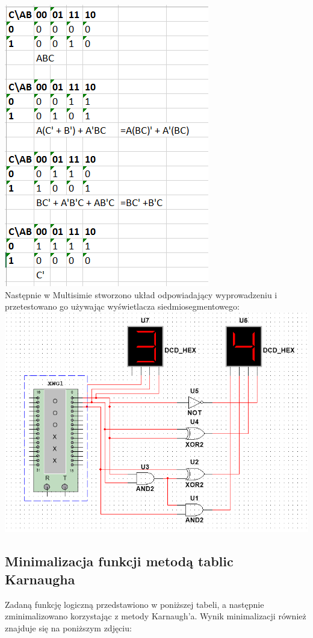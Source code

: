 \documentclass[12pt,a4paper]{article}
\begin{document}
\includegraphics[scale=0.8]{2aKarnaugh}\\
Następnie w Multisimie stworzono układ odpowiadający wyprowadzeniu i przetestowano go używając wyświetlacza siedmiosegmentowego:\\
\includegraphics[scale=0.8]{2aBetter}\\



\subsection{Minimalizacja funkcji metodą tablic Karnaugha}
Zadaną funkcję logiczną przedstawiono w poniższej tabeli, a następnie zminimalizowano korzystając z metody Karnaugh'a. Wynik minimalizacji również znajduje się na poniższym zdjęciu:
\end{document}
